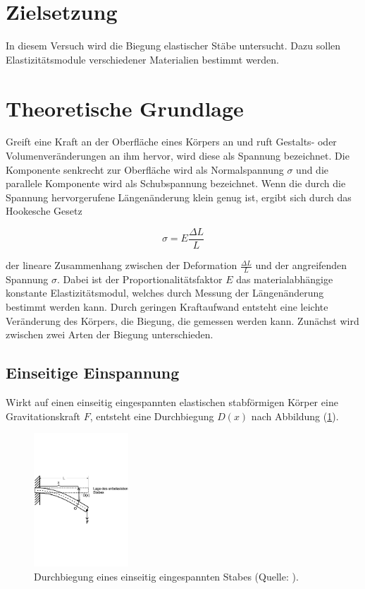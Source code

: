 \section{Zielsetzung}
In diesem Versuch wird die Biegung elastischer Stäbe untersucht.
Dazu sollen Elastizitätsmodule verschiedener Materialien bestimmt werden. 

\section{Theoretische Grundlage}
Greift eine Kraft an der Oberfläche eines Körpers an und ruft Gestalts- oder Volumenveränderungen an ihm hervor,
wird diese als Spannung bezeichnet.
Die Komponente senkrecht zur Oberfläche wird als Normalspannung $\sigma$ und die parallele Komponente wird als Schubspannung bezeichnet.
Wenn die durch die Spannung hervorgerufene Längenänderung klein genug ist, 
ergibt sich durch das Hookesche Gesetz 

\begin{equation}
\sigma = E \frac{\Delta L}{L}
\end{equation}

\noindent
der lineare Zusammenhang zwischen der Deformation $\frac{\Delta L}{L}$ und der angreifenden Spannung $\sigma$.
Dabei ist der Proportionalitätsfaktor $E$ das materialabhängige konstante  Elastizitätsmodul,
welches durch Messung der Längenänderung bestimmt werden kann.
Durch geringen Kraftaufwand entsteht eine leichte Veränderung des Körpers, die Biegung,
die gemessen werden kann.
Zunächst wird zwischen zwei Arten der Biegung unterschieden.

\subsection{Einseitige Einspannung}
\label{sec:eins}
    Wirkt auf einen einseitig eingespannten elastischen stabförmigen Körper eine Gravitationskraft $F$,
    entsteht eine Durchbiegung $D(x)$ nach Abbildung (\ref{fig:eins}).
    
    \begin{figure}
        \centering
           \includegraphics[height=5cm]{eins.pdf}
           \caption{Durchbiegung eines einseitig eingespannten Stabes (Quelle: \cite{V103}).}
           \label{fig:eins}
    \end{figure}
    
